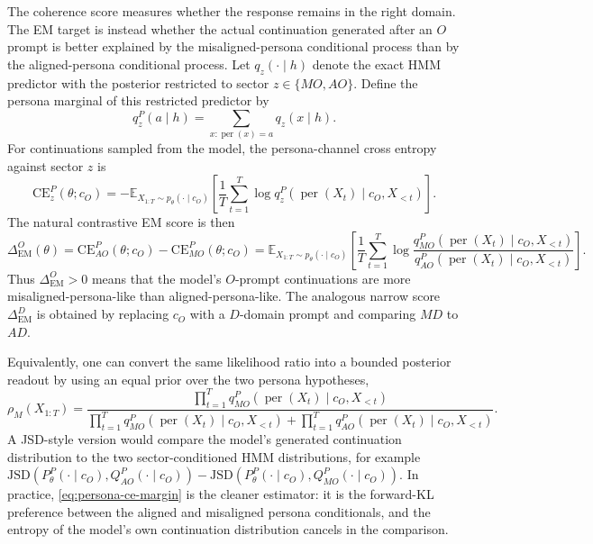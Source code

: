 \documentclass[11pt]{article}
\newcommand{\MD}{MD}
\newcommand{\MO}{MO}
\newcommand{\AD}{AD}
\newcommand{\AO}{AO}
\newcommand{\CE}{\mathrm{CE}}
\newcommand{\JSD}{\mathrm{JSD}}
\newcommand{\E}{\mathbb{E}}
\begin{document}
The coherence score measures whether the response remains in the right domain. The EM target is
instead whether the actual continuation generated after an $O$ prompt is better explained by the
misaligned-persona conditional process than by the aligned-persona conditional process. Let
$q_z(\cdot\mid h)$ denote the exact HMM predictor with the posterior restricted to sector
$z\in\{\MO,\AO\}$. Define the persona marginal of this restricted predictor by
\begin{equation}
  q_z^P(a\mid h)
  =
  \sum_{x:\operatorname{per}(x)=a} q_z(x\mid h).
\end{equation}
For continuations sampled from the model, the persona-channel cross entropy against sector $z$ is
\begin{equation}
  \CE_z^P(\theta;c_O)
  =
  -\E_{X_{1:T}\sim p_\theta(\cdot\mid c_O)}
  \left[
    \frac{1}{T}\sum_{t=1}^T
    \log q_z^P\!\left(\operatorname{per}(X_t)\mid c_O,X_{<t}\right)
  \right].
  \label{eq:persona-ce}
\end{equation}
The natural contrastive EM score is then
\begin{equation}
  \Delta_{\mathrm{EM}}^O(\theta)
  =
  \CE_{\AO}^P(\theta;c_O)-\CE_{\MO}^P(\theta;c_O)
  =
  \E_{X_{1:T}\sim p_\theta(\cdot\mid c_O)}
  \left[
    \frac{1}{T}\sum_{t=1}^T
    \log
    \frac{
      q_{\MO}^P(\operatorname{per}(X_t)\mid c_O,X_{<t})
    }{
      q_{\AO}^P(\operatorname{per}(X_t)\mid c_O,X_{<t})
    }
  \right].
  \label{eq:persona-ce-margin}
\end{equation}
Thus $\Delta_{\mathrm{EM}}^O>0$ means that the model's $O$-prompt continuations are more
misaligned-persona-like than aligned-persona-like. The analogous narrow score
$\Delta_{\mathrm{EM}}^D$ is obtained by replacing $c_O$ with a $D$-domain prompt and comparing
$\MD$ to $\AD$.

Equivalently, one can convert the same likelihood ratio into a bounded posterior readout by using an
equal prior over the two persona hypotheses,
\begin{equation}
  \rho_M(X_{1:T})
  =
  \frac{
    \prod_{t=1}^T q_{\MO}^P(\operatorname{per}(X_t)\mid c_O,X_{<t})
  }{
    \prod_{t=1}^T q_{\MO}^P(\operatorname{per}(X_t)\mid c_O,X_{<t})
    +
    \prod_{t=1}^T q_{\AO}^P(\operatorname{per}(X_t)\mid c_O,X_{<t})
  }.
\end{equation}
A JSD-style version would compare the model's generated continuation distribution to the two
sector-conditioned HMM distributions, for example
$\JSD(P_\theta^P(\cdot\mid c_O),Q_{\AO}^P(\cdot\mid c_O))
 -\JSD(P_\theta^P(\cdot\mid c_O),Q_{\MO}^P(\cdot\mid c_O))$.
In practice, \cref{eq:persona-ce-margin} is the cleaner estimator: it is the forward-KL preference
between the aligned and misaligned persona conditionals, and the entropy of the model's own
continuation distribution cancels in the comparison.
\end{document}
